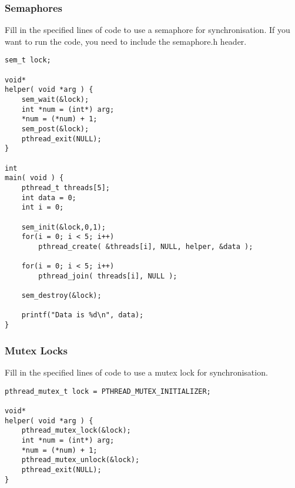 \documentclass[11pt,a4paper]{article}
\begin{document}
\subsubsection{Semaphores}
Fill in the specified lines of code to use a semaphore for synchronisation. If you want to run the code, you need to include the semaphore.h header.
\begin{shaded}
\begin{lstlisting}
sem_t lock;

void*
helper( void *arg ) {
	sem_wait(&lock);
	int *num = (int*) arg;
	*num = (*num) + 1;
	sem_post(&lock);
	pthread_exit(NULL);
}

int
main( void ) {
	pthread_t threads[5];
	int data = 0;
	int i = 0;

	sem_init(&lock,0,1);
	for(i = 0; i < 5; i++)
		pthread_create( &threads[i], NULL, helper, &data );
	
	for(i = 0; i < 5; i++)
		pthread_join( threads[i], NULL );

	sem_destroy(&lock);

	printf("Data is %d\n", data);
}
\end{lstlisting}
\end{shaded}

\subsubsection{Mutex Locks}
Fill in the specified lines of code to use a mutex lock for synchronisation.
\begin{shaded}
\begin{lstlisting}
pthread_mutex_t lock = PTHREAD_MUTEX_INITIALIZER;

void*
helper( void *arg ) {
	pthread_mutex_lock(&lock);
	int *num = (int*) arg;
	*num = (*num) + 1;
	pthread_mutex_unlock(&lock);
	pthread_exit(NULL);
}
\end{lstlisting}
\end{shaded}
\end{document}
